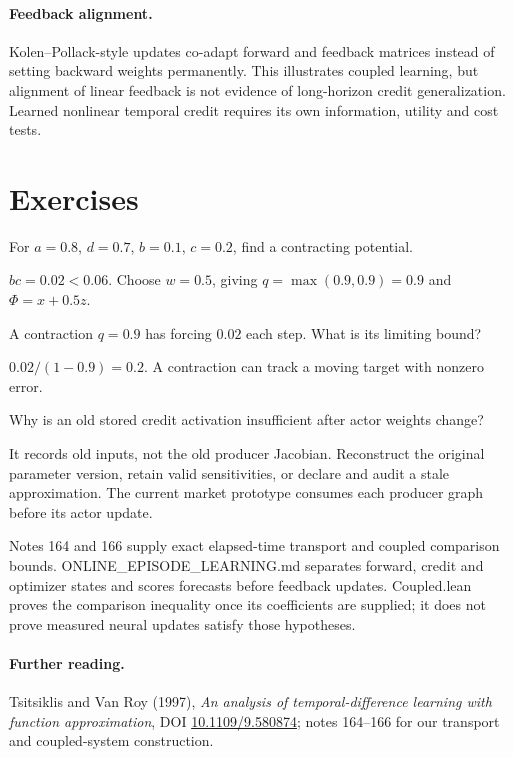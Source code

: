 \documentclass[11pt]{article}
\begin{document}
\paragraph{Feedback alignment.} Kolen--Pollack-style updates co-adapt forward and feedback matrices instead of setting backward weights permanently. This illustrates coupled learning, but alignment of linear feedback is not evidence of long-horizon credit generalization. Learned nonlinear temporal credit requires its own information, utility and cost tests.
\section*{Exercises}
\begin{exercise}For $a=0.8$, $d=0.7$, $b=0.1$, $c=0.2$, find a contracting potential.\end{exercise}
\begin{solution}$bc=0.02<0.06$. Choose $w=0.5$, giving $q=\max(0.9,0.9)=0.9$ and $\Phi=x+0.5z$.\end{solution}
\begin{exercise}A contraction $q=0.9$ has forcing $0.02$ each step. What is its limiting bound?\end{exercise}
\begin{solution}$0.02/(1-0.9)=0.2$. A contraction can track a moving target with nonzero error.\end{solution}
\begin{exercise}Why is an old stored credit activation insufficient after actor weights change?\end{exercise}
\begin{solution}It records old inputs, not the old producer Jacobian. Reconstruct the original parameter version, retain valid sensitivities, or declare and audit a stale approximation. The current market prototype consumes each producer graph before its actor update.\end{solution}
\begin{inourmodels}
Notes 164 and 166 supply exact elapsed-time transport and coupled comparison bounds. ONLINE\_EPISODE\_LEARNING.md separates forward, credit and optimizer states and scores forecasts before feedback updates. Coupled.lean proves the comparison inequality once its coefficients are supplied; it does not prove measured neural updates satisfy those hypotheses.
\end{inourmodels}
\paragraph{Further reading.} Tsitsiklis and Van Roy (1997), \emph{An analysis of temporal-difference learning with function approximation}, DOI \href{https://doi.org/10.1109/9.580874}{10.1109/9.580874}; notes 164--166 for our transport and coupled-system construction.
\end{document}
